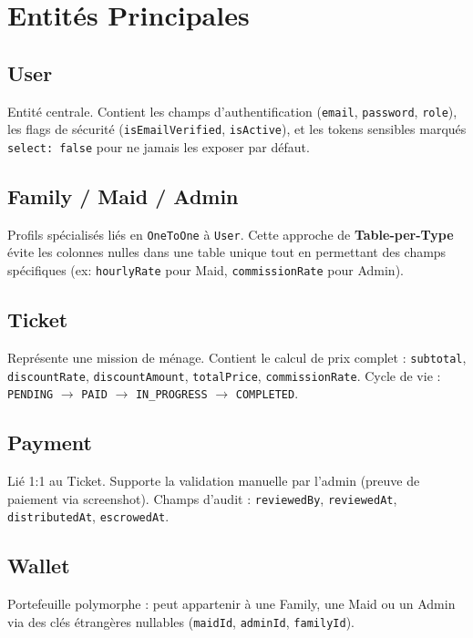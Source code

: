 \documentclass[12pt,a4paper]{report}
\begin{document}
\section{Entités Principales}

\subsection{User}
Entité centrale. Contient les champs d'authentification (\texttt{email}, \texttt{password}, \texttt{role}), les flags de sécurité (\texttt{isEmailVerified}, \texttt{isActive}), et les tokens sensibles marqués \texttt{select: false} pour ne jamais les exposer par défaut.

\subsection{Family / Maid / Admin}
Profils spécialisés liés en \texttt{OneToOne} à \texttt{User}. Cette approche de \textbf{Table-per-Type} évite les colonnes nulles dans une table unique tout en permettant des champs spécifiques (ex: \texttt{hourlyRate} pour Maid, \texttt{commissionRate} pour Admin).

\subsection{Ticket}
Représente une mission de ménage. Contient le calcul de prix complet : \texttt{subtotal}, \texttt{discountRate}, \texttt{discountAmount}, \texttt{totalPrice}, \texttt{commissionRate}. Cycle de vie : \texttt{PENDING} $\to$ \texttt{PAID} $\to$ \texttt{IN\_PROGRESS} $\to$ \texttt{COMPLETED}.

\subsection{Payment}
Lié 1:1 au Ticket. Supporte la validation manuelle par l'admin (preuve de paiement via screenshot). Champs d'audit : \texttt{reviewedBy}, \texttt{reviewedAt}, \texttt{distributedAt}, \texttt{escrowedAt}.

\subsection{Wallet}
Portefeuille polymorphe : peut appartenir à une Family, une Maid ou un Admin via des clés étrangères nullables (\texttt{maidId}, \texttt{adminId}, \texttt{familyId}).

\end{document}

